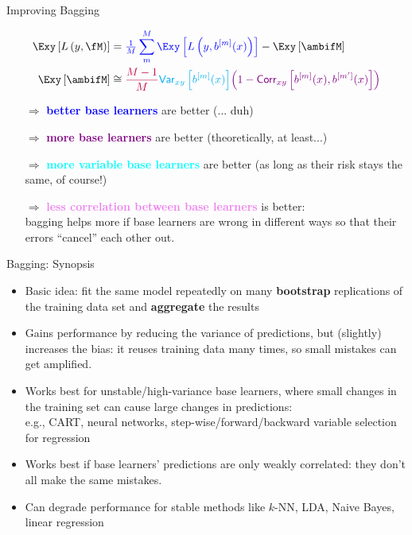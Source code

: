\begin{vbframe}{Improving Bagging}
\begin{small}
\begin{align*}
\Exy\left[L\left(y, \fM\right)\right] &= \textcolor{blue}{\tfrac{1}{M}\sum^M_{m} \Exy\left[L\left(y, \blm \right)\right]} - \Exy\left[\ambifM\right]\\
\Exy\left[\ambifM\right] &\cong 
\textcolor{purple}{\frac{M-1}{M}} \textcolor{cyan}{\var_{xy}\left[\blm\right]} \textcolor{violet}{\left(1 - \corr_{xy}\left[\blm, \bl{m'}\right]\right)}
\end{align*}
\end{small}
\begin{itemize}
\item[$\Rightarrow$] \textcolor{blue}{\textbf{better base learners}} are better {\small (... duh)}
\item[$\Rightarrow$] \textcolor{purple}{\textbf{more base learners}} are better {\small (theoretically, at least...)}\\
\item[$\Rightarrow$] \textcolor{cyan}{\textbf{more variable base learners}} are better {\small(as long as their risk stays the same, of course!)}
\item[$\Rightarrow$] \textcolor{violet}{\textbf{less correlation between base learners}} is better:\\ bagging helps more if base learners are wrong in different ways so that their errors \enquote{cancel} each other out.\\
\end{itemize}


\end{vbframe}

\begin{vbframe}{Bagging: Synopsis}

  \begin{itemize}
    \item Basic idea: fit the same model repeatedly on many \textbf{bootstrap} replications of the training data set and \textbf{aggregate} the results
    \item Gains performance by reducing the variance of predictions, but (slightly) increases the bias: it reuses training data many times, so small mistakes can get amplified. 
    \item Works best for unstable/high-variance base learners, where small changes in the training set can cause large changes in predictions:\\
    e.g., CART, neural networks, step-wise/forward/backward variable selection for regression\\
     \item Works best if base learners' predictions are only weakly correlated: they don't all make the same mistakes.
         \item Can degrade performance for stable methods like $k$-NN, LDA, Naive Bayes, linear regression
  \end{itemize}
\end{vbframe}

\endlecture


